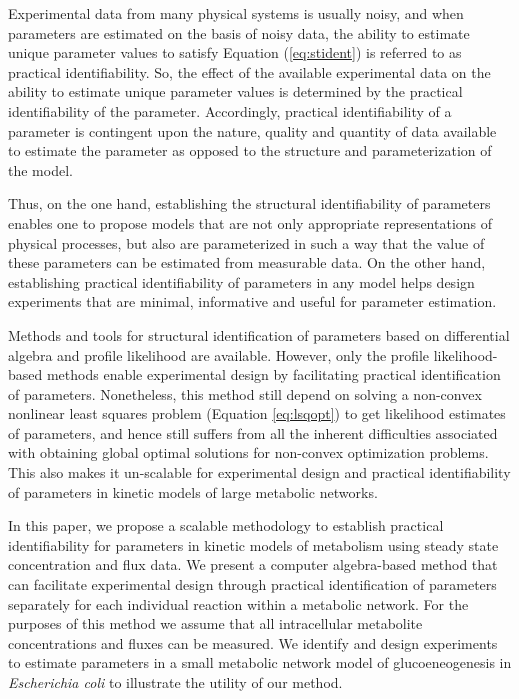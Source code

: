 \documentclass[10pt]{article}
\begin{document}
	Experimental data from many physical systems is usually noisy, and when parameters are estimated on the basis of noisy data, the ability to estimate unique parameter values to satisfy Equation (\ref{eq:stident}) is referred to as practical identifiability. So, the effect of the available experimental data on the ability to estimate unique parameter values is determined by the practical identifiability of the parameter. Accordingly, practical identifiability of a parameter is contingent upon the nature, quality and quantity of data available to estimate the parameter as opposed to the structure and parameterization of the model. 
	
	Thus, on the one hand, establishing the structural identifiability of parameters enables one to propose models that are not only appropriate representations of physical processes, but also are parameterized in such a way that the value of these parameters can be estimated from measurable data. On the other hand, establishing practical identifiability of parameters in any model helps design experiments that are minimal, informative and useful for parameter estimation.
	
	Methods and tools for structural identification of parameters based on differential algebra \parencite{Ljung1994, Audoly2001, Bellu2007} and profile likelihood \parencite{Raue2009a} are available. However, only the profile likelihood-based methods enable experimental design by facilitating practical identification of parameters. Nonetheless, this method still depend on solving a non-convex nonlinear least squares problem (Equation \ref{eq:lsqopt}) to get likelihood estimates of parameters, and hence still suffers from all the inherent difficulties associated with obtaining global optimal solutions for non-convex optimization problems. This also makes it un-scalable for experimental design and practical identifiability of parameters in kinetic models of large metabolic networks.
	
	In this paper, we propose a scalable methodology to establish practical identifiability for parameters in kinetic models of metabolism using steady state concentration and flux data. We present a computer algebra-based method that can facilitate experimental design through practical identification of parameters separately for each individual reaction within a metabolic network. For the purposes of this method we assume that all intracellular metabolite concentrations and fluxes can be measured. We identify and design experiments to estimate parameters in a small metabolic network model of glucoeneogenesis in \textit{Escherichia coli} \parencite{Kotte2014, Srinivasan2017} to illustrate the utility of our method.  %
	
\end{document}
